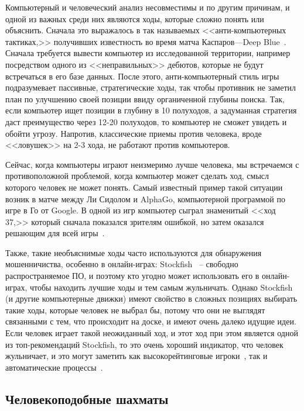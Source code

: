 \documentclass{article}
\begin{document}
Компьютерный и человеческий анализ несовместимы и по другим причинам,
и одной из важных среди них являются ходы, которые сложно понять или объяснить.
Сначала это выражалось в так называемых <<анти-компьютерных тактиках,>>
получивших известность во время матча Каспаров---Deep Blue~\cite{kasparov-anti-computer-chess}.
Сначала требуется вывести компьютер из исследованной территории,
например посредством одного из <<неправильных>> дебютов,
которые не будут встречаться в его базе данных.
После этого, анти-компьютерный стиль игры подразумевает пассивные, стратегические ходы,
так чтобы противник не заметил план по улучшению своей позиции ввиду органиченной глубины поиска.
Так, если компьютер ищет позиции в глубину в 10 полуходов, а задуманная стратегия даст преимущество через
12-20 полуходов, то компьютер не сможет увидеть и обойти угрозу.
Напротив, классические приемы против человека, вроде <<ловушек>> на 2-3 хода,
не работают против компьютеров.

Сейчас, когда компьютеры играют неизмеримо лучше человека,
мы встречаемся с противоположной проблемой,
когда компьютер может сделать ход,
смысл которого человек не может понять.
Самый известный пример такой ситуации возник в матче между Ли Сидолом и AlphaGo,
компьютерной программой по игре в Го от Google.
В одной из игр компьютер сыграл знаменитый <<ход 37,>>
который сначала показался зрителям ошибкой,
но затем оказался решающим для всей игры~\cite{wired-alphago}.

Также, такие необъяснимые ходы часто используются для обнаружения
мошенничиства, особенно в онлайн-играх:
Stockfish~\cite{stockfish} -- свободно распространяемое ПО,
и поэтому кто угодно может использовать его в онлайн-играх,
чтобы находить лучшие ходы и тем самым жульничать.
Однако Stockfish (и другие компьютерные движки)
имеют свойство в сложных позициях выбирать такие ходы, которые человек не выбрал бы,
потому что они не выглядят связанными с тем, что происходит на доске,
и имеют очень далеко идущие идеи.
Если человек играет такой неожиданный ход, и этот ход при этом
является одной из топ-рекомендаций Stockfish,
то это очень хороший индикатор, что человек жульничает,
и это могут заметить как высокорейтинговые игроки~\cite{gothamchess-cheater-exposed},
так и автоматические процессы~\cite{lichess-kaladin}.

\subsection{Человекоподобные шахматы}
\end{document}
